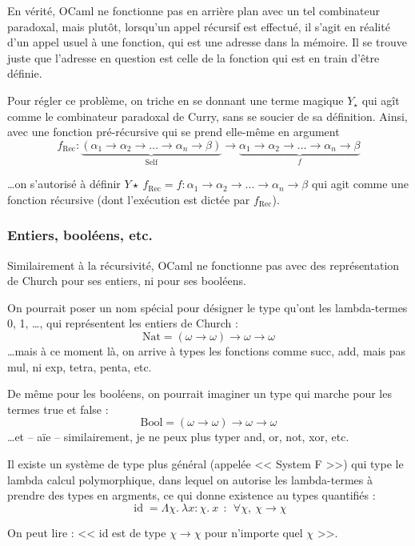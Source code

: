 \documentclass[11pt]{article}
\begin{document}
En vérité, OCaml ne fonctionne pas en arrière plan avec un tel combinateur paradoxal, mais plutôt, lorsqu'un appel récursif est effectué, il s'agit en réalité d'un appel usuel à une fonction, qui est une adresse dans la mémoire. Il se trouve juste que l'adresse en question est celle de la fonction qui est en train d'être définie.

Pour régler ce problème, on triche en se donnant une terme magique $Y_\star$ qui agît comme le combinateur paradoxal de Curry, sans se soucier de sa définition. Ainsi, avec une fonction pré-récursive qui se prend elle-même en argument
$$f_\text{Rec} : \underbrace{(\alpha_1 \to\alpha_2\to\dots\to\alpha_n\to\beta)}_\text{Self}\to\underbrace{\alpha_1 \to\alpha_2\to\dots\to\alpha_n\to\beta}_f $$

\dots on s'autorisé à définir $Y\star~f_\text{Rec}=f:\alpha_1 \to\alpha_2\to\dots\to\alpha_n\to\beta$ qui agit comme une fonction récursive (dont l'exécution est dictée par $f_\text{Rec}$).

\subsubsection{Entiers, booléens, etc.}

Similairement à la récursivité, OCaml ne fonctionne pas avec des représentation de Church pour ses entiers, ni pour ses booléens.

On pourrait poser un nom spécial pour désigner le type qu'ont les lambda-termes 0, 1, \dots, qui représentent les entiers de Church :
$$\text{Nat} = (\omega\to\omega)\to\omega\to\omega$$
\dots mais à ce moment là, on arrive à types les fonctions comme succ, add, mais pas mul, ni exp, tetra, penta, etc.

De même pour les booléens, on pourrait imaginer un type qui marche pour les termes true et false :
$$\text{Bool} = (\omega\to\omega)\to\omega\to\omega$$
\dots et -- aïe -- similairement, je ne peux plus typer and, or, not, xor, etc.

\begin{remark}
    Il existe un système de type plus général (appelée << System F >>) qui type le lambda calcul polymorphique, dans lequel on autorise les lambda-termes à prendre des types en argments, ce qui donne existence au types quantifiés :
    $$\operatorname{id}=\Lambda \chi.~\lambda x:\chi.~x~~:~~\forall\chi,~\chi\to\chi$$

    On peut lire : << id est de type $\chi\to\chi$ pour n'importe quel $\chi$ >>.
\end{remark}
\end{document}
